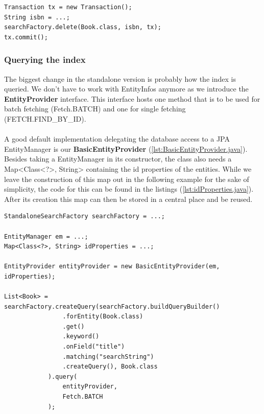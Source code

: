 \lstset{language=java}
\begin{lstlisting}[frame=htrbl, caption={Deleting an object by id with the standalone}, label={lst:deleting_object_native.java}]
Transaction tx = new Transaction();
String isbn = ...;
searchFactory.delete(Book.class, isbn, tx);
tx.commit();
\end{lstlisting}

\subsubsection{Querying the index} \label{querying_standalone}
The biggest change in the standalone version is probably how the index is queried. We don't have to work with EntityInfos anymore as we introduce the \textbf{EntityProvider} interface. This interface hosts one method that is to be used for batch fetching (Fetch.BATCH) and one for single fetching (FETCH.FIND\_BY\_ID).
\\\\
A good default implementation delegating the database access to a JPA EntityManager is our \textbf{BasicEntityProvider} (\ref{lst:BasicEntityProvider.java}). Besides taking a EntityManager in its constructor, the class also needs a Map<Class<?>, String> containing the id properties of the entities. While we leave the construction of this map out in the following example for the sake of simplicity, the code for this can be found in the listings (\ref{lst:idProperties.java}). After its creation this map can then be stored in a central place and be reused.
\\
\lstset{language=java}
\begin{lstlisting}[frame=htrbl, caption={Querying the index with the standalone}, label={lst:querying_natively.java}]
StandaloneSearchFactory searchFactory = ...;

EntityManager em = ...;
Map<Class<?>, String> idProperties = ...;

EntityProvider entityProvider = new BasicEntityProvider(em, idProperties);

List<Book> = searchFactory.createQuery(searchFactory.buildQueryBuilder()
				.forEntity(Book.class)
				.get()
				.keyword()
				.onField("title")
				.matching("searchString")
				.createQuery(), Book.class
			).query(
				entityProvider,
				Fetch.BATCH
			);
\end{lstlisting}

\pagebreak

